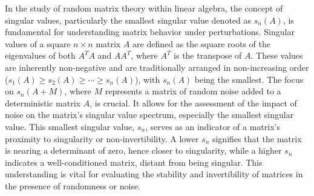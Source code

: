 In the study of random matrix theory within linear algebra, the concept of singular values, particularly the smallest singular value denoted as $s_n(A)$, is fundamental for understanding matrix behavior under perturbations. Singular values of a square $n \times n$ matrix $A$ are defined as the square roots of the eigenvalues of both $A^TA$ and $AA^T$, where $A^T$ is the transpose of $A$. These values are inherently non-negative and are traditionally arranged in non-increasing order ($s_1(A) \geq s_2(A) \geq \cdots \geq s_n(A)$), with $s_n(A)$ being the smallest. The focus on $s_n(A+M)$, where $M$ represents a matrix of random noise added to a deterministic matrix $A$, is crucial. It allows for the assessment of the impact of noise on the matrix's singular value spectrum, especially the smallest singular value. This smallest singular value, $s_n$, serves as an indicator of a matrix's proximity to singularity or non-invertibility. A lower $s_n$ signifies that the matrix is nearing a determinant of zero, hence closer to singularity, while a higher $s_n$ indicates a well-conditioned matrix, distant from being singular. This understanding is vital for evaluating the stability and invertibility of matrices in the presence of randomness or noise.
